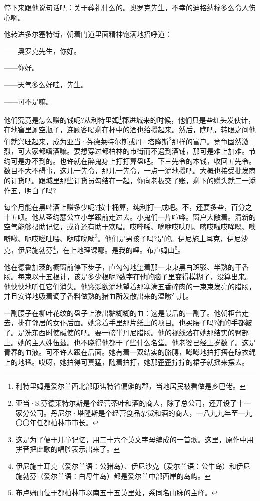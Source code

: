 \par 停下来跟他说句话吧：关于葬礼什么的。奥罗克先生，不幸的迪格纳穆多么令人伤心啊。
\par 他转进多尔塞特街，朝着门道里面精神饱满地招呼道：
\par ——奥罗克先生，你好。
\par ——你好。
\par ——天气多么好哇，先生。
\par ——可不是嘛。
\par 他们究竟是怎么赚的钱呢?从利特里姆\footnote{利特里姆是爱尔兰西北部康诺特省偏僻的郡，当地居民被看做是乡巴佬。}郡进城来的时候，他们只是些红头发伙计，在地窖里涮空瓶子，连顾客喝剩在杯中的酒也给攒起来。然后，瞧吧，转眼之间他们就兴旺起来，成为亚当·芬德莱特尔斯或丹·塔隆斯\footnote{亚当·S.芬德莱特尔斯是个经营茶叶和酒的商人，除了总公司，还开设了十一家分公司。丹尼尔·塔隆斯是个经营食品杂货和酒的商人，一八九九年至一九〇〇年任都柏林市市长。}那样的富户。竞争固然激烈，可大家都嗜酒嘛。要想穿过都柏林的市街而不遇到酒铺，那可是难上加难。节约可是办不到的。也许就在醉鬼身上打打算盘吧。下三先令的本钱，收回五先令。数目不大不碍事，这儿一先令，那儿一先令，一点一滴地攒吧。大概也接受批发商的订货吧。跟城里那些订货员勾结在一起，你向老板交了账，剩下的赚头就二一添作五，明白了吗?
\par 每个月能在黑啤酒上赚多少呢?按十桶算，纯利打一成吧。不，还要多些，百分之十五呗。他从圣约瑟公立小学跟前走过去。小鬼们一片喧哗。窗户大敞着。清新的空气能够帮助记忆，或许还有助于欢唱。哎哔唏、嘀咿哎呋叽、喀哎啦哎哞嗯、噢噼啾、呃哎咝吐喂、哒哺唲呦\footnote{这是为了便于儿童记忆，用二十六个英文字母编成的一首歌。这里，原作中用拼音把此歌的唱腔表示出来了。}。他们是男孩子吗?是的。伊尼施土耳克，伊尼沙克，伊尼施勃芬\footnote{伊尼施土耳克（爱尔兰语：公猪岛）、伊尼沙克（爱尔兰语：公牛岛）和伊尼施勃芬（爱尔兰语：白母牛岛）都是爱尔兰中部西岸的岛屿。}，在上地理课哪。是我的哩。布卢姆山\footnote{布卢姆山位于都柏林市以南五十五英里处，系同名山脉的主峰。}。
\par 他在德鲁加茨的橱窗前停下步子，直勾勾地望着那一束束黑白斑驳、半熟的干香肠。每束以十五根计，该是多少根呢?数字在他的脑子里变得模糊了，没算出来。他怏怏地听任它们消失。他馋涎欲滴地望着那塞满五香碎肉的一束束发亮的腊肠，并且安详地吸着调了香料做熟的猪血所发散出来的温暾气儿。
\par 一副腰子在柳叶花纹的盘子上渗出黏糊糊的血：这是最后的一副了。他朝柜台走去，排在邻居的女仆后面。她念着手里那片纸上的项目。也买腰子吗?她的手都皴了。是洗东西时使碱使的吧。要一磅半丹尼腊肠。他的视线落在她那结实的臀部上。她的主人姓伍兹。也不晓得他都干了些什么名堂。他老婆已经上岁数了。这是青春的血液。可不许人跟在后面。她有着一双结实的胳膊，嘭嘭地拍打搭在晾衣绳上的地毯。哎呀，她拍得可真猛，随着拍打，她那歪歪拧拧的裙子就摇来摆去。
